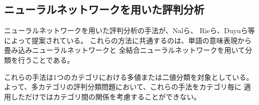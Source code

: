 \documentclass{ttisummary}
\begin{document}


\subsection{ニューラルネットワークを用いた評判分析}

ニューラルネットワークを用いた評判分析の手法が、Nalら\cite{nal14}、
Rieら\cite{rie14}、Duyuら\cite{duyu15}等によって提案されている。
これらの方法に共通するのは、単語の意味表現から畳み込みニューラルネットワークと
全結合ニューラルネットワークを用いて分類を行うことである。

これらの手法は1つのカテゴリにおける多値または二値分類を対象としている。
よって、多カテゴリの評判分類問題において、これらの手法をカテゴリ毎に
適用しただけではカテゴリ間の関係を考慮することができない。
\end{document}
